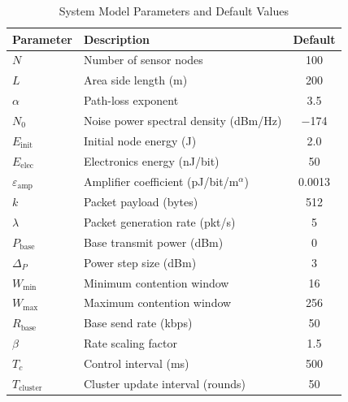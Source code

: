 \documentclass[a4paper]{cas-dc}
\numberwithin{equation}{section}
\begin{document}
\begin{table}[htbp]
\centering
\caption{System Model Parameters and Default Values}
\label{tab:sysparams}
\begin{tabular}{@{} l l c @{}}
\toprule
\textbf{Parameter} & \textbf{Description} & \textbf{Default} \\
\midrule
$N$                        & Number of sensor nodes                        & 100    \\
$L$                        & Area side length (m)                          & 200    \\
$\alpha$                   & Path-loss exponent                            & 3.5    \\
$N_0$                      & Noise power spectral density (dBm/Hz)         & $-$174 \\
$E_{\text{init}}$          & Initial node energy (J)                       & 2.0    \\
$E_{\text{elec}}$          & Electronics energy (nJ/bit)                   & 50     \\
$\varepsilon_{\text{amp}}$ & Amplifier coefficient (pJ/bit/m$^\alpha$)     & 0.0013 \\
$k$                        & Packet payload (bytes)                        & 512    \\
$\lambda$                  & Packet generation rate (pkt/s)                & 5      \\
$P_{\text{base}}$          & Base transmit power (dBm)                     & 0      \\
$\Delta_P$                 & Power step size (dBm)                         & 3      \\
$W_{\min}$                 & Minimum contention window                     & 16     \\
$W_{\max}$                 & Maximum contention window                     & 256    \\
$R_{\text{base}}$          & Base send rate (kbps)                         & 50     \\
$\beta$                    & Rate scaling factor                           & 1.5    \\
$T_c$                      & Control interval (ms)                         & 500    \\
$T_{\text{cluster}}$       & Cluster update interval (rounds)              & 50     \\
\bottomrule
\end{tabular}
\end{table}
\end{document}
